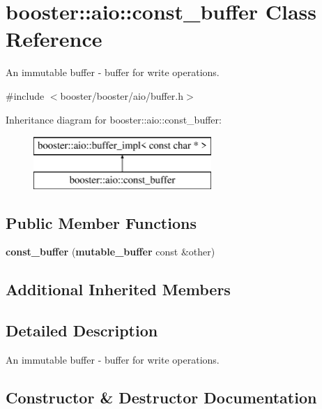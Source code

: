 \section{booster\+:\+:aio\+:\+:const\+\_\+buffer Class Reference}
\label{classbooster_1_1aio_1_1const__buffer}


An immutable buffer -\/ buffer for write operations.  




{\ttfamily \#include $<$booster/booster/aio/buffer.\+h$>$}

Inheritance diagram for booster\+:\+:aio\+:\+:const\+\_\+buffer\+:\begin{figure}[H]
\begin{center}
\leavevmode
\includegraphics[height=2.000000cm]{classbooster_1_1aio_1_1const__buffer}
\end{center}
\end{figure}
\subsection*{Public Member Functions}
\begin{DoxyCompactItemize}
\item 
{\bf const\+\_\+buffer} ({\bf mutable\+\_\+buffer} const \&other)
\end{DoxyCompactItemize}
\subsection*{Additional Inherited Members}


\subsection{Detailed Description}
An immutable buffer -\/ buffer for write operations. 

\subsection{Constructor \& Destructor Documentation}
